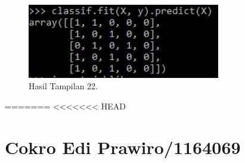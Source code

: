 \begin{figure}[ht]\centerline{\includegraphics[width=0.75\textwidth]{figures/huda/31.JPG}}\caption{Hasil Tampilan 22.}\end{figure}

=======
<<<<<<< HEAD
\section{Cokro Edi Prawiro/1164069}

